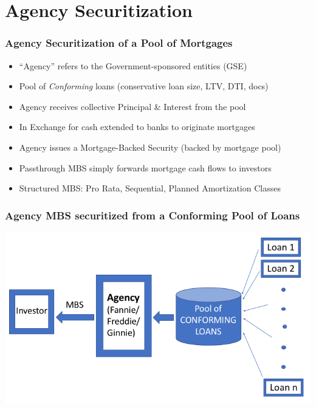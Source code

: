 \documentclass{beamer}
\begin{document}
\section{Agency Securitization}

\begin{frame}
\frametitle{Agency Securitization of a Pool of Mortgages}
\begin{itemize}
\item ``Agency'' refers to the Government-sponsored entities (GSE)
\item Pool of {\em Conforming} loans (conservative loan size, LTV, DTI, docs)
\item Agency receives collective Principal \& Interest from the pool
\item In Exchange for cash extended to banks to originate mortgages
\item Agency issues a Mortgage-Backed Security (backed by mortgage pool)
\item Passthrough MBS simply forwards mortgage cash flows to investors
\item Structured MBS: Pro Rata, Sequential, Planned Amortization Classes
\end{itemize}
\end{frame}

\begin{frame}
\frametitle{Agency MBS securitized from a Conforming Pool of Loans}
\includegraphics[scale=0.35]{securitization_flow.png}
\end{frame}

\end{document}
